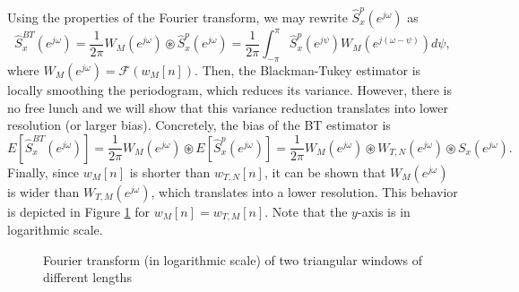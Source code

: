 Using the properties of the Fourier transform, we may rewrite $\hat{S}_x^{p}(e^{j \omega})$ as
\begin{equation}
\label{eq:BT_convolution}
\hat{S}_x^{BT}(e^{j \omega}) = \frac{1}{2 \pi} W_M(e^{j \omega}) \circledast \hat{S}_x^{p}(e^{j \omega}) = \frac{1}{2 \pi} \int_{-\pi}^{\pi} \hat{S}_x^{p}(e^{j \psi}) W_{M}(e^{j (\omega - \psi)}) d \psi,
\end{equation} 
where $W_M(e^{j \omega}) = \mathcal{F}(w_M[n])$. Then, the Blackman-Tukey estimator is locally smoothing the periodogram, which reduces its variance. However, there is no free lunch and we will show that this variance reduction translates into lower resolution (or larger bias). Concretely, the bias of the BT estimator is
\begin{equation}
\label{eq:BT_convolution}
E\left[\hat{S}_x^{BT}(e^{j \omega})\right] = \frac{1}{2 \pi} W_M(e^{j \omega}) \circledast E\left[\hat{S}_x^{p}(e^{j \omega})\right] = \frac{1}{2 \pi} W_M(e^{j \omega}) \circledast  W_{T,N}(e^{j \omega}) \circledast S_x(e^{j \omega}).
\end{equation}
Finally, since $w_M[n]$ is shorter than $w_{T,N}[n]$, it can be shown that $W_M(e^{j \omega})$ is wider than $W_{T,M}(e^{j \omega})$, which translates into a lower resolution. This behavior is depicted in Figure \ref{fig:comparison_windows} for $w_M[n] = w_{T,M}[n]$. Note that the $y$-axis is in logarithmic scale.
\begin{figure}
	\begin{center}
	\end{center}
	\caption{Fourier transform (in logarithmic scale) of two triangular windows of different lengths}
	\label{fig:comparison_windows}
\end{figure}

